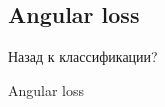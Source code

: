 \subsection{Angular loss}

\begin{frame}{Назад к классификации?}
    
\end{frame}

\begin{frame}{Angular loss}
    
\end{frame}

